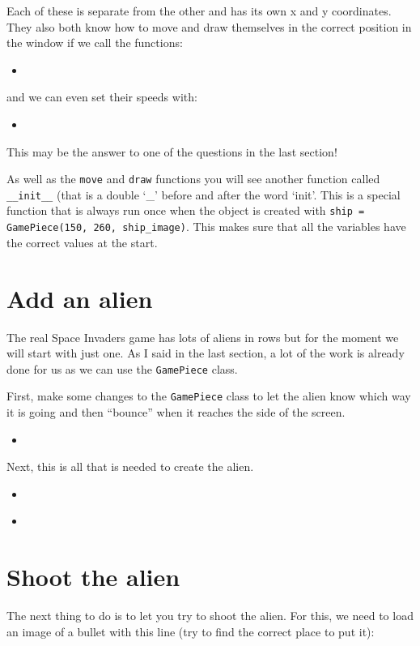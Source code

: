 \documentclass[12pt]{article}
\newcommand{\pythonscript}[2]{
\needspace{.125\textheight}
\begin{itemize}
\item[]
\end{itemize}
}
\newenvironment{hint}{
  \begin{tcolorbox}[colback=green!5,colframe=green!40!black,title=Note]}
{\end{tcolorbox}}
\begin{document}
Each of these is separate from the other and has its own x and y coordinates.
They also both know how to move and draw themselves in the correct position
in the window if we call the functions:

\pythonscript{explanation2}{Function call example}

and we can even set their speeds with:

\pythonscript{explanation3}{Setting object variables}

\begin{hint}
This may be the answer to one of the questions in the last section!
\end{hint}

As well as the \texttt{move} and \texttt{draw} functions you will see another
function called \texttt{\_\_init\_\_} (that is a double `\_' before and after
the word `init'. This is a special function that is always run once when the
object is created with \texttt{ship = GamePiece(150, 260, ship\_image)}.
This makes sure that all the variables have the correct values at the start.

\section{Add an alien}

The real Space Invaders game has lots of aliens in rows but for the moment we
will start with just one. As I said in the last section, a lot of the work is
already done for us as we can use the \texttt{GamePiece} class.

First, make some changes to the \texttt{GamePiece} class to let the alien
know which way it is going and then ``bounce'' when it reaches the side of the
screen.

\pythonscript{bounce}{Changes to the class}

Next, this is all that is needed to create the alien.

\pythonscript{makealien}{Create the alien object}

\pythonscript{usealien}{Use the alien object}

\section{Shoot the alien}

The next thing to do is to let you try to shoot the alien. For this, we need
to load an image of a bullet with this line (try to find the correct place to
put it):
\end{document}
